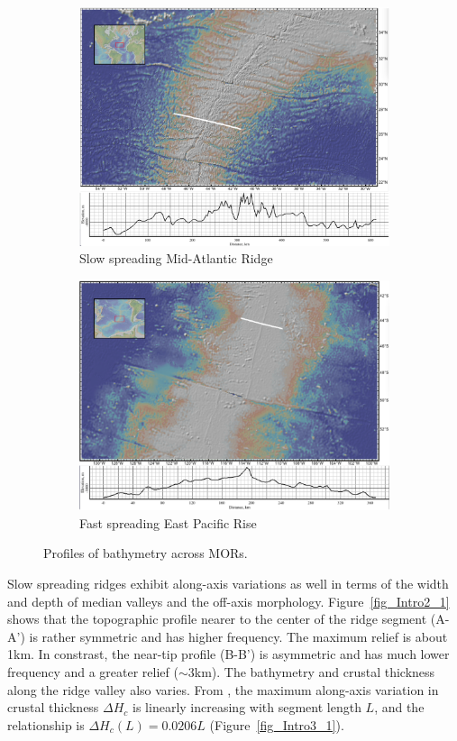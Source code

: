 \begin{figure}[H]
\centering
\begin{subfigure}{.5\textwidth}
  \centering
  \includegraphics[width=.8\linewidth]{./Figures/fig_Intro1_1.png}
  \caption{\small{Slow spreading Mid-Atlantic Ridge}}
  \label{fig_Intro1_1}
\end{subfigure}%
\begin{subfigure}{.5\textwidth}
  \centering
  \includegraphics[width=.8\linewidth]{./Figures/fig_Intro1_3.png}
  \caption{\small{Fast spreading East Pacific Rise}}
  \label{fig_Intro1_3}
\end{subfigure}
\caption{\small{Profiles of bathymetry across MORs.}}
\label{fig_Intro1_3}
\end{figure}
Slow spreading ridges exhibit along-axis variations as well in terms of the width and depth of median valleys and the off-axis morphology.  Figure~\ref{fig_Intro2_1} shows that the topographic profile nearer to the center of the ridge segment (A-A') is rather symmetric and has higher frequency. The maximum relief is about 1km. In constrast, the near-tip profile (B-B') is asymmetric and has much lower frequency and a greater relief ($\sim$3km). The bathymetry and crustal thickness along the ridge valley also varies. From \citep{Chen1999}, the maximum along-axis variation in crustal thickness $\Delta H_{c}$ is linearly increasing with segment length $L$, and the relationship is $\Delta H_{c}(L)=0.0206L$ (Figure~\ref{fig_Intro3_1}).

